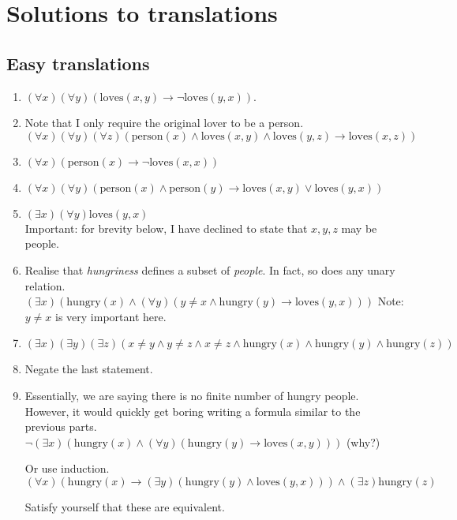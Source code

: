 \documentclass[10pt,a4paper]{article}
\begin{document}
\newpage

\newcommand{\loves}[1]{\textrm{loves}(#1)}
\newcommand{\person}[1]{\textrm{person}(#1)}
\newcommand{\hungry}[1]{\textrm{hungry}(#1)}

\section{Solutions to translations}
\subsection{Easy translations}
\begin{enumerate}
    \item \( (\forall x) (\forall y) \left( \loves{x, y} \rightarrow \neg \loves{y, x} \right) \).
    \item Note that I only require the original lover to be a person. \\
    \( (\forall x) (\forall y) (\forall z) \left( 
        \person{x} \land \loves{x, y} \land \loves{y, z} \rightarrow \loves{x, z} \right) \)
    \item \( (\forall x) \left( \person{x} \rightarrow \neg \loves{x, x} \right) \)
    \item \( (\forall x) (\forall y) \left(
        \person{x} \land \person{y} \rightarrow \loves{x, y} \lor \loves{y, x} \right) \)
    \item \( (\exists x) (\forall y) \loves{y, x} \) \\

    Important: for brevity below, I have declined to state that \(x, y, z\) may be people.
    \item Realise that \emph{hungriness} defines a subset of \emph{people}.
    In fact, so does any unary relation.\\
    \( (\exists x) \left( \hungry{x} \land (\forall y) \left( 
        y \ne x \land \hungry{y} \rightarrow \loves{y, x} \right) \right) \)
    Note: \(y \ne x\) is very important here.

    \item \( (\exists x) (\exists y) (\exists z) \left( x \ne y \land y \ne z \land 
        x \ne z \land \hungry{x} \land \hungry{y} \land \hungry{z} \right) \)

    \item Negate the last statement.

    \item Essentially, we are saying there is no finite number of hungry people.
    However, it would quickly get boring writing a formula similar to the previous parts. \\
    \( \neg (\exists x) \left( \hungry{x} \land 
        (\forall y) \left( \hungry{y} \rightarrow \loves{x, y} \right) \right) \) (why?)

    Or use induction.
    \( (\forall x) \left( \hungry{x} \rightarrow (\exists y) \left(
        \hungry{y} \land \loves{y, x} \right) \right) \land 
        (\exists z) \hungry{z} \)

    Satisfy yourself that these are equivalent.
\end{enumerate}
\end{document}
